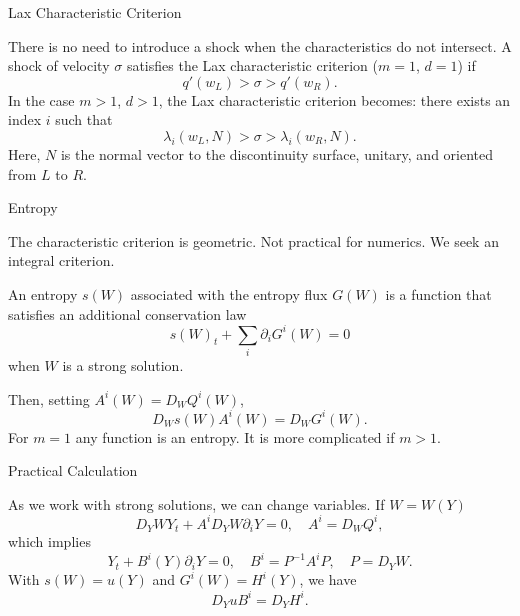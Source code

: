 \documentclass[english]{beamer}
\begin{document}
\begin{frame}{Lax Characteristic Criterion}

There is no need to introduce a shock when the characteristics do not intersect. A shock of velocity $\sigma$ satisfies the Lax characteristic criterion ($m=1$, $d=1$) if
\[
q'(w_{L})>\sigma>q'(w_{R}).
\]
In the case $m>1$, $d>1$, the Lax characteristic criterion becomes:
there exists an index $i$ such that
\[
\lambda_{i}(w_{L},N)>\sigma>\lambda_{i}(w_{R},N).
\]
Here, $N$ is the normal vector to the discontinuity surface, unitary, and oriented from $L$ to $R$.
\end{frame}
%
\begin{frame}{Entropy}

The characteristic criterion is geometric. Not practical for numerics.
We seek an integral criterion.

An entropy $s(W)$ associated with the entropy flux $G(W)$ is a function
that satisfies an additional conservation law
\[
s(W)_{t}+\sum_{i}\partial_{i}G^{i}(W)=0
\]
when $W$ is a strong solution.

Then, setting $A^{i}(W)=D_{W}Q^{i}(W)$,
\[
D_{W}s(W)A^{i}(W)=D_{W}G^{i}(W).
\]
For $m=1$ any function is an entropy. It is more complicated if $m>1$.
\end{frame}
%
\begin{frame}{Practical Calculation}

As we work with strong solutions, we can change variables.
If $W=W(Y)$
\[
D_{Y}WY_{t}+A^{i}D_{Y}W\partial_{i}Y=0,\quad A^{i}=D_{W}Q^{i},
\]
which implies
\[
Y_{t}+B^{i}(Y)\partial_{i}Y=0,\quad B^{i}=P^{-1}A^{i}P,\quad P=D_{Y}W.
\]
With $s(W)=u(Y)$ and $G^{i}(W)=H^{i}(Y)$, we have
\[
D_{Y}uB^{i}=D_{Y}H^{i}.
\]

\end{frame}
%
\end{document}
